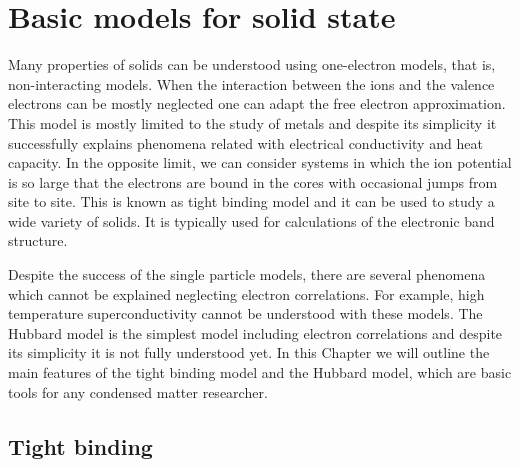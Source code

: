 \chapter{Basic models for solid state}

Many properties of solids can be understood using one-electron models, that is, non-interacting models. When the interaction between the ions and the valence electrons can be mostly neglected one can adapt the free electron approximation. This model is mostly limited to the study of metals and despite its simplicity it successfully explains phenomena related with electrical conductivity and heat capacity. In the opposite limit, we can consider systems in which the ion potential is so large that the electrons are bound in the cores with occasional jumps from site to site. This is known as tight binding model and it can be used to study a wide variety of solids. It is typically used for calculations of the electronic band structure.

Despite the success of the single particle models, there are several phenomena which cannot be explained neglecting electron correlations. For example, high temperature superconductivity cannot be understood with these models. The Hubbard model is the simplest model including electron correlations and despite its simplicity it is not fully understood yet. In this Chapter we will outline the main features of the tight binding model and the Hubbard model, which are basic tools for any condensed matter researcher.

\section{Tight binding}
